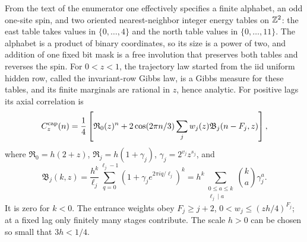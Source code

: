 \begin{lemma}\label{lem:cap-parent}
From the text of the enumerator one effectively specifies a finite alphabet, an odd one-site spin, and two oriented nearest-neighbor integer energy tables on \(\mathbb Z^2\): the east table takes values in \(\{0,\ldots,4\}\) and the north table values in \(\{0,\ldots,11\}\). The alphabet is a product of binary coordinates, so its size is a power of two, and addition of one fixed bit mask is a free involution that preserves both tables and reverses the spin. For \(0<z<1\), the trajectory law started from the iid uniform hidden row, called the invariant-row Gibbs law, is a Gibbs measure for these tables, and its finite marginals are rational in \(z\), hence analytic. For positive lags its axial correlation is
\begin{equation}\label{eq:cap-correlation}
 C^{\rm cap}_z(n)=\frac14\left[\mathfrak R_0(z)^n+
 2\cos(2\pi n/3)\sum_j w_j(z)\mathfrak B_j(n-F_j,z)\right],
\end{equation}
where \(\mathfrak R_0=h(2+z)\), \(\mathfrak R_j=h(1+\gamma_j)\), \(\gamma_j=2^{v_j}z^{s_j}\), and
\begin{equation}\label{eq:cap-orbit}
 \mathfrak B_j(k,z)=\frac{h^k}{\ell_j}
 \sum_{q=0}^{\ell_j-1}(1+\gamma_j e^{2\pi iq/\ell_j})^k
 =h^k\!\sum_{\substack{0\le a\le k\\\ell_j\mid a}}
 \binom{k}{a}\gamma_j^a.
\end{equation}
It is zero for \(k<0\). The entrance weights obey \(F_j\ge j+2\), \(0<w_j\le(zh/4)^{F_j}\); at a fixed lag only finitely many stages contribute. The scale \(h>0\) can be chosen so small that \(3h<1/4\).
\end{lemma}

